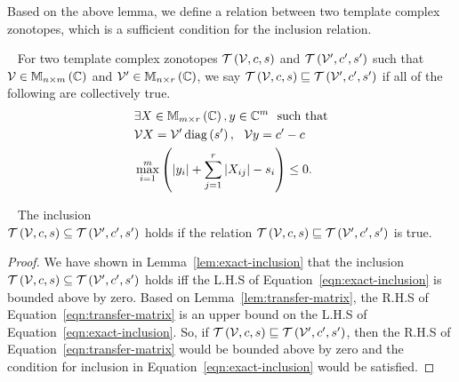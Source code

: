 %
Based on the above lemma, we define a relation between two template
complex zonotopes, which is a sufficient condition for the inclusion
relation.
%
\begin{definition}~\label{defn:inclusion-tcz}
For two template complex zonotopes $\mathit{\operatorname{\mathcal{T}}}\left(\mathcal{V},c,s\right)$
and $\mathit{\operatorname{\mathcal{T}}}\left(\mathcal{V}^\prime,c^\prime,s^\prime\right)$ such that
$\mathcal{V}\in\mathbb{M}_{n\times m}\left(\mathbb{C}\right)$ and
$\mathcal{V}^\prime\in\mathbb{M}_{n\times r}\left(\mathbb{C}\right)$, we say
$\mathit{\operatorname{\mathcal{T}}}\left(\mathcal{V},c,s\right)\sqsubseteq\mathit{\operatorname{\mathcal{T}}}\left(\mathcal{V}^\prime,c^\prime,s^\prime\right)$
if all of the following are collectively true.
%
\begin{align*}
& \exists X\in\mathbb{M}_{m\times r}\left(\mathbb{C}\right),y\in\mathbb{C}^m~~\text{such
that}\\
& \mathcal{V}X=\mathcal{V}^\prime\operatorname{diag}\left(s^\prime\right),~~\mathcal{V}y=c^\prime-c\\
& \max_{i=1}^m\left(\left|y_i\right|+\sum_{j=1}^r\left|X_{ij}\right|-s_i\right)\leq
0.
\end{align*}
%
\end{definition}
%
\begin{theorem}~\label{thm:suff-inclusion}
The inclusion\\
$\mathit{\operatorname{\mathcal{T}}}\left(\mathcal{V},c,s\right)\subseteq\mathit{\operatorname{\mathcal{T}}}\left(\mathcal{V}^\prime,c^\prime,s^\prime\right)$
holds if the relation
$\mathit{\operatorname{\mathcal{T}}}\left(\mathcal{V},c,s\right)\sqsubseteq\mathit{\operatorname{\mathcal{T}}}\left(\mathcal{V}^\prime,c^\prime,s^\prime\right)$
is true.
\end{theorem}
%
\begin{proof}
We have shown in Lemma~\ref{lem:exact-inclusion} that the inclusion
$\mathit{\operatorname{\mathcal{T}}}\left(\mathcal{V},c,s\right)\subseteq\mathit{\operatorname{\mathcal{T}}}\left(\mathcal{V}^\prime,c^\prime,s^\prime\right)$
holds iff the L.H.S of Equation~\ref{eqn:exact-inclusion} is bounded
above by zero.  Based on Lemma~\ref{lem:transfer-matrix}, the R.H.S of
Equation~\ref{eqn:transfer-matrix} is an upper bound on the L.H.S of
Equation~\ref{eqn:exact-inclusion}.  So, if
$\mathit{\operatorname{\mathcal{T}}}\left(\mathcal{V},c,s\right)\sqsubseteq\mathit{\operatorname{\mathcal{T}}}\left(\mathcal{V}^\prime,c^\prime,s^\prime\right)$,
then the R.H.S of Equation~\ref{eqn:transfer-matrix} would be
bounded above by zero and the condition for inclusion in
Equation~\ref{eqn:exact-inclusion} would be satisfied.
\end{proof}
%
%
